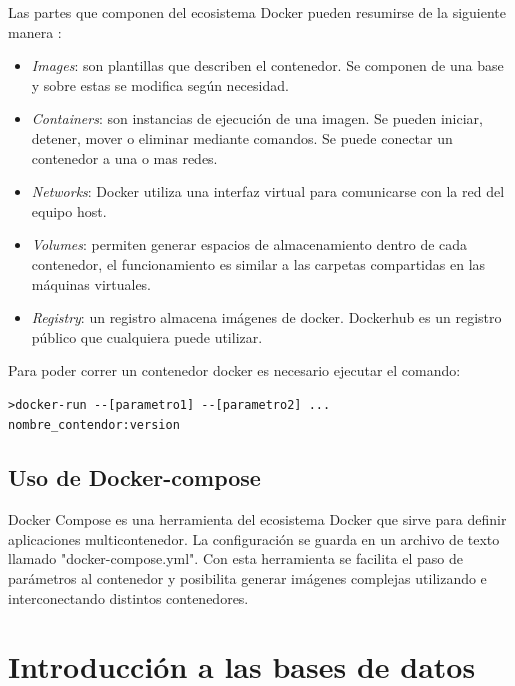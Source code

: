 Las partes que componen del ecosistema Docker pueden resumirse de la siguiente manera \citep{WEBSITE:8}\citep{WEBSITE:9}:

\begin{itemize}
\item \textit{Images}: son plantillas que describen el contenedor. Se componen de una base y sobre estas se modifica según necesidad.
\item \textit{Containers}: son instancias de ejecución de una imagen. Se pueden iniciar, detener, mover o eliminar mediante comandos. Se puede conectar un contenedor a una o mas redes.
\item \textit{Networks}: Docker utiliza una interfaz virtual para comunicarse con la red del equipo host.
\item \textit{Volumes}: permiten generar espacios de almacenamiento dentro de cada contenedor, el funcionamiento es similar a las carpetas compartidas en las máquinas virtuales.
\item \textit{Registry}: un registro almacena imágenes de docker. Dockerhub es un registro público que cualquiera puede utilizar.
\end{itemize}

Para poder correr un contenedor docker es necesario ejecutar el comando:
\begin{lstlisting}[label=docker:vControl,caption=Ejecución de contenedor.]  
>docker-run --[parametro1] --[parametro2] ...
nombre_contendor:version
\end{lstlisting}


\subsection{Uso de Docker-compose}
\label{subsec:Docker-compose}

Docker Compose es una herramienta del ecosistema Docker que sirve para definir aplicaciones multicontenedor. La configuración se guarda en un archivo de texto llamado "docker-compose.yml". 
Con esta herramienta se facilita el paso de parámetros al contenedor y posibilita generar imágenes complejas utilizando e interconectando distintos contenedores.

 

\section{Introducción a las bases de datos}
\label{sec: Introducción a las bases de datos}

